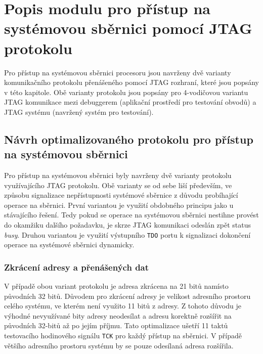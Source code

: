 \chapter{Popis modulu pro přístup na systémovou sběrnici pomocí JTAG protokolu}	\label{jtag_ap}
Pro přístup na systémovou sběrnici procesoru jsou navrženy dvě varianty komunikačního protokolu přenášeného pomocí JTAG rozhraní, které jsou popsány v této kapitole. Obě varianty protokolu jsou popsány pro 4-vodičovou variantu \acs{JTAG} komunikace mezi debuggerem (aplikační prostředí pro testování obvodů) a \acs{JTAG} systému (navržený systém pro testování).

\section{Návrh optimalizovaného protokolu pro přístup na systémovou sběrnici}	\label{sec:protokoly}
Pro přístup na systémovou sběrnici byly navrženy dvě varianty protokolu využívajícího JTAG protokolu. Obě varianty se od sebe liší především, ve způsobu signalizace nepřístupnosti systémové sběrnice z důvodu probíhající operace na sběrnici. První variantou je využití obdobného principu jako u stávajícího řešení. Tedy pokud se operace na systémovou sběrnici nestihne provést do okamžiku dalšího požadavku, je skrze JTAG komunikaci odeslán zpět status \textit{busy}. Druhou variantou je využití výstupního \texttt{\acs{TDO}} portu k signalizaci dokončení operace na systémové sběrnici dynamicky.

\subsection{Zkrácení adresy a přenášených dat}
V případě obou variant protokolu je adresa zkrácena na 21 bitů namísto původních 32 bitů. Důvodem pro zkrácení adresy je velikost adresního prostoru celého systému, ve kterém není využito 11 bitů z adresy. Z tohoto důvodu je výhodné nevyužívané bity adresy neodesílat a adresu korektně rozšířit na původních 32-bitů až po jejím příjmu. Tato optimalizace ušetří 11 taktů testovacího hodinového signálu \texttt{\acs{TCK}} pro každý přístup na sběrnici. V případě většího adresního prostoru systému by se pouze odesílaná adresa rozšířila.

